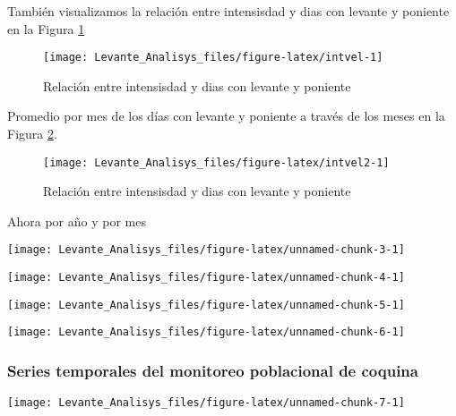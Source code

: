 \documentclass[
]{article}
\begin{document}
También visualizamos la relación entre intensisdad y dias con levante y poniente en la Figura \ref{fig:intvel}

\begin{figure}

{\centering \texttt{[image: Levante\_Analisys\_files/figure-latex/intvel-1]} 

}

\caption{Relación entre intensisdad y dias con levante y poniente}\label{fig:intvel}
\end{figure}

Promedio por mes de los días con levante y poniente a través de los meses en la Figura \ref{fig:intvel2}.

\begin{figure}

{\centering \texttt{[image: Levante\_Analisys\_files/figure-latex/intvel2-1]} 

}

\caption{Relación entre intensisdad y dias con levante y poniente}\label{fig:intvel2}
\end{figure}
\newpage

Ahora por año y por mes

\begin{center}\texttt{[image: Levante\_Analisys\_files/figure-latex/unnamed-chunk-3-1]} \end{center}

\begin{center}\texttt{[image: Levante\_Analisys\_files/figure-latex/unnamed-chunk-4-1]} \end{center}

\begin{center}\texttt{[image: Levante\_Analisys\_files/figure-latex/unnamed-chunk-5-1]} \end{center}

\begin{center}\texttt{[image: Levante\_Analisys\_files/figure-latex/unnamed-chunk-6-1]} \end{center}
\newpage

\subsubsection{Series temporales del monitoreo poblacional de coquina}\label{series-temporales-del-monitoreo-poblacional-de-coquina}

\begin{center}\texttt{[image: Levante\_Analisys\_files/figure-latex/unnamed-chunk-7-1]} \end{center}
\end{document}
